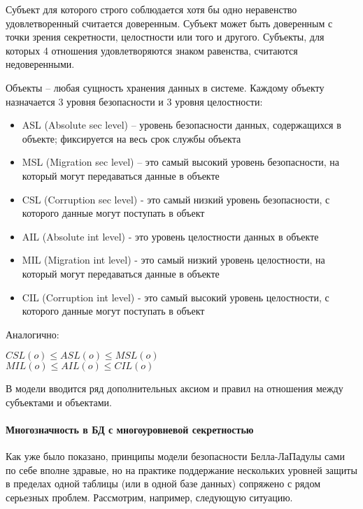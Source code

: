 Субъект для которого строго соблюдается хотя бы одно неравенство удовлетворенный считается доверенным. Субъект может 
быть доверенным с точки зрения секретности, целостности или того и другого. Субъекты, для которых 4 отношения 
удовлетворяются знаком равенства, считаются недоверенными.

Объекты -- любая сущность хранения данных в системе. Каждому объекту назначается 3 уровня безопасности и 
3 уровня целостности:
\begin{itemize}
    \item ASL (Absolute sec level) -- уровень безопасности данных, содержащихся в объекте; фиксируется на весь срок 
    службы объекта
    \item MSL (Migration sec level) -- это самый высокий уровень безопасности, на который могут передаваться данные 
    в объекте
    \item CSL (Corruption sec level) - это самый низкий уровень безопасности, с которого данные могут поступать в объект
    \item AIL (Absolute int level) - это уровень целостности данных в объекте
    \item MIL (Migration int level) - это самый низкий уровень целостности, на который могут передаваться данные в объекте
    \item CIL (Corruption int level) - это самый высокий уровень целостности, с которого данные могут поступать в объект
\end{itemize}

Аналогично:

\begin{center}
$CSL(o) \leqslant ASL(o) \leq MSL(o)$ \\
$MIL(o) \leqslant AIL(o) \leq CIL(o)$
\end{center}

В модели вводится ряд дополнительных аксиом и правил на отношения между субъектами и объектами.

\paragraph{Многозначность в БД с многоуровневой секретностью}

Как уже было показано,  принципы модели безопасности Белла-ЛаПадулы сами по себе вполне здравые,  но на практике поддержание нескольких уровней защиты в пределах одной таблицы (или в одной базе данных) сопряжено с рядом серьезных проблем.  Рассмотрим, например, следующую ситуацию.

